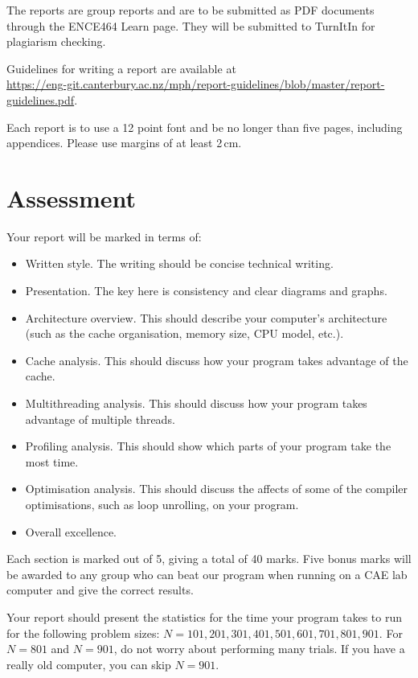 \documentclass[a4paper,11pt]{article}
\begin{document}
The reports are group reports and are to be submitted as PDF documents
through the ENCE464 Learn page.  They will be submitted to TurnItIn
for plagiarism checking.

Guidelines for writing a report are available at\\
\url{https://eng-git.canterbury.ac.nz/mph/report-guidelines/blob/master/report-guidelines.pdf}.

Each report is to use a 12 point font and be no longer than five
pages, including appendices.  Please use margins of at least 2\,cm.


\section{Assessment}

Your report will be marked in terms of:
%
\begin{itemize}
\item Written style.  The writing should be concise technical writing.
\item Presentation.  The key here is consistency and clear diagrams
  and graphs.
\item Architecture overview.  This should describe your computer's
  architecture (such as the cache organisation, memory size, CPU model,
  etc.).
\item Cache analysis.  This should discuss how your program takes
  advantage of the cache.  
\item Multithreading analysis.  This should discuss how your program
  takes advantage of multiple threads.
\item Profiling analysis.  This should show which parts of your program take the most time.
\item Optimisation analysis.  This should discuss the affects of some
  of the compiler optimisations, such as loop unrolling, on your
  program.
\item Overall excellence.
\end{itemize}
%
Each section is marked out of 5, giving a total of 40 marks.  Five
bonus marks will be awarded to any group who can beat our program when
running on a CAE lab computer and give the correct results.

Your report should present the statistics for the time your program
takes to run for the following problem sizes: $N=101, 201, 301, 401,
501, 601, 701, 801, 901$.  For $N=801$ and $N=901$, do not worry about
performing many trials.  If you have a really old computer, you can
skip $N=901$.
\end{document}
